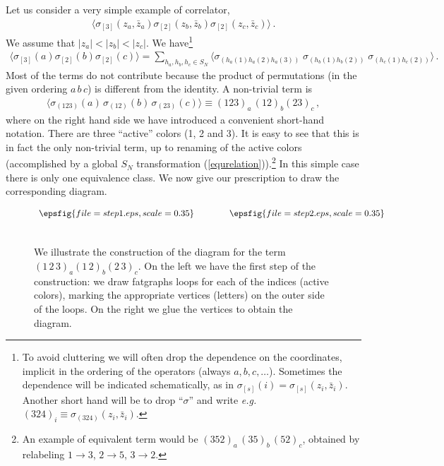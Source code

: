\documentclass[letterpaper]{JHEP3}
\def\s{\sigma}
\def\be{\begin{equation}}
\def\ee{\end{equation}}
\def\be{\begin{eqnarray}}
\def\ee{\end{eqnarray}}
\begin{document}
Let us consider a very simple example of correlator, 
\be \label{simpleexample}
\langle \sigma_{[3]} (z_a, \bar z_a) \sigma_{[2]} (z_b, \bar z_b) \sigma_{[2]} (z_c, \bar z_c ) \rangle\, .
\ee
We assume that $|z_a|  < |z_b |  < |z_c|$. We have\footnote{To avoid cluttering we will often drop the dependence on the coordinates,
implicit in the ordering of the operators (always $a, b, c, \dots$). Sometimes the dependence
will be indicated schematically, as in $\sigma_{[s]} (i) = \sigma_{[s]} (z_i , \bar z_i) $. Another short
hand  will be to drop  ``$\sigma$'' and write {\it e.g.} $(324)_i  \equiv \sigma_{(324)}(z_i, \bar z_i)  $. }
\be
\langle \sigma_{[3]} (a) \sigma_{[2]} (b) \sigma_{[2]} (c) \rangle  = 
\sum_{h_a, h_b, h_c \in S_N} \langle \s_{(h_a(1) h_a(2) h_a(3)  ) } \; \s_{(h_b(1) h_b(2)   ) }  \; \s_{(h_c(1) h_c(2)   ) }   \rangle \,.
\ee
Most of the terms do not contribute because the product of permutations (in the given ordering $a\, b \,c$) is different from the identity.
A non-trivial term is
\be
\langle \sigma_{(123)} (a)  \, \sigma_{(12)} (b) \,   \sigma_{(23)}(c)  \rangle  \equiv (123)_a \, (12)_b  (23)_c \, ,
\ee
where on  the right hand side we have introduced a convenient short-hand notation. There are three ``active'' colors (1, 2 and 3).
It is easy to see that this is in fact the only non-trivial term, up to renaming of the active colors (accomplished
by a global $S_N$ transformation (\ref{equrelation})).\footnote{
An example of equivalent term would be  $(352)_a \, (35)_b \, (52)_c$, 
obtained by relabeling $1 \to 3$, $2 \to 5$, $3\to 2$.  
} 
In this simple case there is only one equivalence class. We now give our prescription to draw the corresponding 
diagram.
\begin{figure}[htbp]
\begin{center}
$\begin{array}{c@{\hspace{0.55in}}c}
  \epsfig{file=step1.eps,scale=0.35}& \epsfig{file=step2.eps,scale=0.35}  \\
\\ [0.2cm]
\end{array}$
\end{center}
  \caption{We illustrate the construction of the diagram for the term
$(1\,2\,3)_a(1\,2)_b(2\,3)_c$. On the left we have the first step of the construction: we draw fatgraphs loops for
each of the indices (active colors), 
marking the appropriate vertices (letters) on the outer side of the loops.  On the right we glue the vertices to obtain the diagram.} \label{combdiag}
\end{figure}
\end{document}
